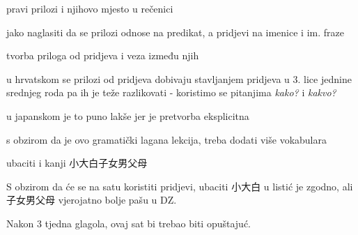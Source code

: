 
\author{Tomislav Mamić}

	
	
	\begin{hyou}
		\item pravi prilozi i njihovo mjesto u rečenici
		\item jako naglasiti da se prilozi odnose na predikat, a pridjevi na imenice i im. fraze
		\item tvorba priloga od pridjeva i veza između njih
		\begin{hyou}
			\item u hrvatskom se prilozi od pridjeva dobivaju stavljanjem pridjeva u 3. lice jednine srednjeg roda pa ih je teže razlikovati - koristimo se pitanjima \textit{kako?} i \textit{kakvo?}
			\item u japanskom je to puno lakše jer je pretvorba eksplicitna
		\end{hyou}
		\item s obzirom da je ovo gramatički lagana lekcija, treba dodati više vokabulara
		\item ubaciti i kanji 小大白子女男父母
	\end{hyou}

	\fukudai{Napomene}
	
	\begin{hyou}
		\item S obzirom da će se na satu koristiti pridjevi, ubaciti 小大白 u listić je zgodno, ali 子女男父母 vjerojatno bolje pašu u DZ.
		\item Nakon 3 tjedna glagola, ovaj sat bi trebao biti opuštajuć.
	\end{hyou}
